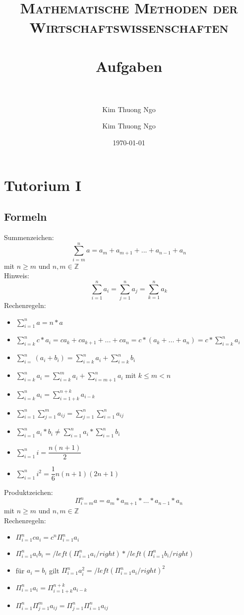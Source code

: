 \documentclass[paper=a4, fontsize=11pt]{scrartcl}
\author{Kim Thuong Ngo}
\title{
\normalfont \normalsize
\textsc{Mathematische Methoden der Wirtschaftswissenschaften} \\ [25pt]
\horrule{0.5pt} \\[0.4cm]
\huge Aufgaben \\
\horrule{2pt} \\[0.5cm]
}
\author{Kim Thuong Ngo}
\date{\normalsize\today}
\numberwithin{equation}{section}
\numberwithin{figure}{section}
\numberwithin{table}{section}
\begin{document}
\maketitle

\newpage

\tableofcontents

\newpage
\section{Tutorium I}
\subsection{Formeln}
Summenzeichen: $$\sum^{n}_{i=m}a = 
a_{m}+a_{m+1}+...+a_{n-1}+a_{n}$$ mit $n \geq m$ und $n,m \in \mathbb{Z}$ \\
Hinweis: $$\sum^{n}_{i=1}a_{i} 
= \sum^{n}_{j=1}a_{j}
= \sum^{n}_{k=1}a_{k}  $$ 
Rechenregeln:
\begin{itemize}
\item $\sum^{n}_{i=1}a = n*a$
\item $\sum^{n}_{i=k}c*a_{i} 
= ca_{k} +ca_{k+1}+...+ca_{n}
= c*(a_{k}+...+a_{n})
= c* \sum^{n}_{i=k}a_{i} $
\item $\sum^{n}_{i=}(a_{i}+b_{i})
= \sum^{n}_{i=k}a_{i}  + \sum^{n}_{i=k}b_{i} $
\item $\sum^{n}_{i=k}a_{i} 
= \sum^{m}_{i=k}a_{i} + \sum^{n}_{i=m+1}a_{i}$ mit $k \leq m < n$
\item $\sum^{n}_{i=k}a_{i} 
= \sum^{n+k}_{i=1+k}a_{i-k}$
\item $\sum^{n}_{i=1} \sum^{m}_{j=1}a_{ij}
= \sum^{n}_{j=1} \sum^{n}_{i=1}a_{ij} $
\item $\sum^{n}_{i=1}a_{i}*b_{i} 
\neq \sum^{n}_{i=1}a_{i} * \sum^{n}_{i=1}b_{i}$
\item $\sum^{n}_{i=1}i = \dfrac{n(n+1)}{2}$
\item $\sum^{n}_{i=1}i^{2} = \dfrac{1}{6}n(n+1)(2n+1)$
\end{itemize}

Produktzeichen: $$\Pi^{n}_{i=m}a = 
a_{m}*a_{m+1}*...*a_{n-1}*a_{n}$$ mit $n \geq m$ und $n,m \in \mathbb{Z}$ \\
Rechenregeln:
\begin{itemize}
\item $\Pi^{n}_{i=1}ca_{i}
=c^{n} \Pi^{n}_{i=1}a_{i}$
\item $\Pi^{n}_{i=1}a_{i}b_{i}
= /left( \Pi^{n}_{i=1}a_{i} /right) * /left( \Pi^{n}_{i=1}b_{i} /right)$
\item für $a_{i} = b_{i}$ gilt 
$ \Pi^{n}_{i=1}a_{i}^{2} = /left( \Pi^{n}_{i=1}a_{i} /right) ^{2}$
\item $\Pi^{n}_{i=1}a_{i} 
= \Pi^{n+k}_{i=1+k}a_{i-k}$
\item $\Pi^{n}_{i=1} \Pi^{m}_{j=1}a_{ij}
= \Pi^{n}_{j=1} \Pi^{n}_{i=1}a_{ij} $
\end{itemize}
\end{document}
